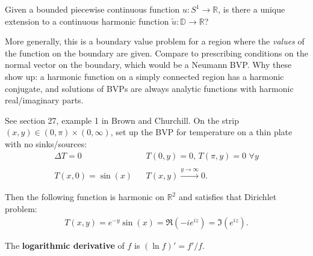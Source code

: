 \begin{definition}

Given a bounded piecewise continuous function \(u:S^1\to {\mathbb{R}}\),
is there a unique extension to a continuous harmonic function
\(\tilde u: {\mathbb{D}}\to {\mathbb{R}}\)?

\end{definition}

\begin{remark}

More generally, this is a boundary value problem for a region where the
\emph{values} of the function on the boundary are given. Compare to
prescribing conditions on the normal vector on the boundary, which would
be a Neumann BVP. Why these show up: a harmonic function on a simply
connected region has a harmonic conjugate, and solutions of BVPs are
always analytic functions with harmonic real/imaginary parts.

\end{remark}

\begin{example}

See section 27, example 1 in Brown and Churchill. On the strip
\((x, y)\in (0, \pi) \times(0, \infty)\), set up the BVP for temperature
on a thin plate with no sinks/sources:
\begin{align*}
\Delta T = 0 && T(0, y) = 0,\, T(\pi, y) = 0 \,\,\forall y \\ \\
T(x, 0) = \sin(x) && T(x, y) \overset{y\to\infty}\longrightarrow 0
.\end{align*}

Then the following function is harmonic on \({\mathbb{R}}^2\) and
satisfies that Dirichlet problem:
\begin{align*}
T(x ,y) = e^{-y} \sin(x) = \Re(-ie^{iz}) = \Im(e^{iz})
.\end{align*}

\end{example}

\begin{definition}

The \textbf{logarithmic derivative} of \(f\) is \((\ln f)' = f'/f\).

\end{definition}

